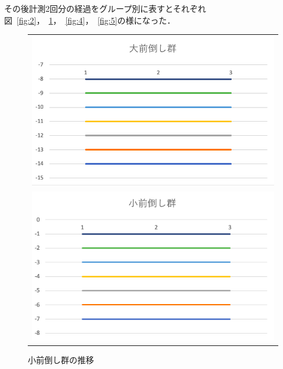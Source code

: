 その後計測2回分の経過をグループ別に表すとそれぞれ図~\ref{fig:2}，~\ref{fig:3}，~\ref{fig:4}，~\ref{fig:5}の様になった．

\begin{figure}[htb]
\begin{center}
\begin{tabular}{c}

  \begin{minipage}[htb]{\linewidth}
  \begin{center}
  \includegraphics[width=12cm]{images/7/2.png}
  \caption{大前倒し群の推移}
  \label{fig:2}
  \end{center}
  \end{minipage}
  
  \\
  
  \begin{minipage}[htb]{\linewidth}
  \begin{center}
  \includegraphics[width=12cm]{images/7/3.png}
  \caption{小前倒し群の推移}
  \label{fig:3}
  \end{center}
  \end{minipage}

\end{tabular}
\end{center}
\end{figure}

